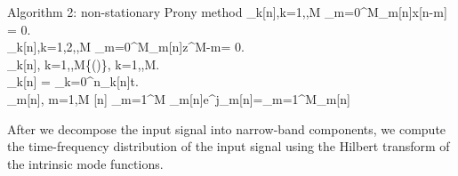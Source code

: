 \begin{algorithm}{Algorithm 2: non-stationary Prony method}{}
     \displaystyle {}_k[n],k=1,\cdots,M \gets \sum_{m=0}^{M}_m[n]x[n-m] = 0. \\
     \displaystyle {}_k[n],k=1,2,\cdots,M \gets \sum_{m=0}^{M}_m[n]z^{M-m}= 0.\\
     \displaystyle \hat{\omega}_k[n], k=1,\cdots,M\gets\Re\left\{\left(\right)\right\}, k=1,\cdots,M.\\
     \displaystyle \hat{\phi}_k[n] = \sum_{k=0}^{n}\hat{\omega}_k[n]\Delta t.\\
     \displaystyle {}_m[n], m=1,\cdots M \gets {}[n] \approx \sum_{m=1}^M _m[n]e^{j\hat{\phi}_m[n]}=\sum_{m=1}^M_m[n]
\end{algorithm}





After we decompose the input signal into narrow-band components, 
we compute the time-frequency distribution of the input signal 
using the Hilbert transform of the intrinsic mode functions.

\newpage



